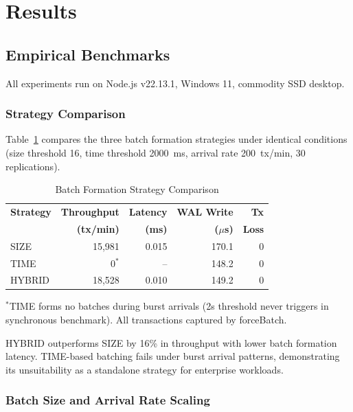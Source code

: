 
\section{Results}

\subsection{Empirical Benchmarks}

All experiments run on Node.js v22.13.1, Windows 11, commodity SSD desktop.

\subsubsection{Strategy Comparison}

Table~\ref{tab:strategy} compares the three batch formation strategies under
identical conditions (size threshold 16, time threshold 2000~ms, arrival rate
200~tx/min, 30 replications).

\begin{table}[ht]
\centering
\caption{Batch Formation Strategy Comparison}
\label{tab:strategy}
\begin{tabular}{lrrrr}
\toprule
\textbf{Strategy} & \textbf{Throughput} & \textbf{Latency} & \textbf{WAL Write} & \textbf{Tx} \\
                   & \textbf{(tx/min)}   & \textbf{(ms)}    & \textbf{($\mu$s)}  & \textbf{Loss} \\
\midrule
SIZE   & 15,981 & 0.015 & 170.1 & 0 \\
TIME   & 0$^*$  & --    & 148.2 & 0 \\
HYBRID & 18,528 & 0.010 & 149.2 & 0 \\
\bottomrule
\end{tabular}
\begin{flushleft}
\small $^*$TIME forms no batches during burst arrivals (2s threshold never
triggers in synchronous benchmark). All transactions captured by forceBatch.
\end{flushleft}
\end{table}

HYBRID outperforms SIZE by 16\% in throughput with lower batch formation latency.
TIME-based batching fails under burst arrival patterns, demonstrating its
unsuitability as a standalone strategy for enterprise workloads.

\subsubsection{Batch Size and Arrival Rate Scaling}

